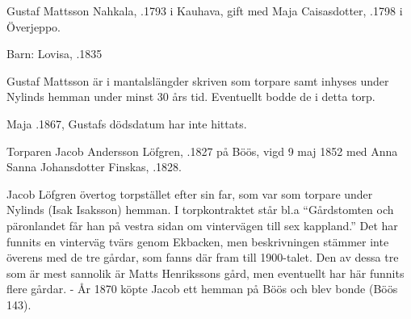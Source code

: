 Gustaf Mattsson Nahkala, .1793 i Kauhava, gift med Maja Caisasdotter, .1798 i Överjeppo.

Barn:	Lovisa, .1835

Gustaf Mattsson är i mantalslängder skriven som torpare samt inhyses under Nylinds hemman under minst 30 års tid. Eventuellt bodde de i detta torp.

Maja .1867, Gustafs dödsdatum har inte hittats.




Torparen Jacob Andersson Löfgren, .1827 på Böös, vigd 9 maj 1852 med Anna Sanna Johansdotter Finskas, .1828.
\begin{jhchildren}
  \item {}
  \item {}
  \item {}
  \item {}
  \item {}
  \item {}
  \item {}
\end{jhchildren}
Jacob Löfgren övertog torpstället efter sin far, som var som torpare under Nylinds (Isak Isaksson) hemman. I torpkontraktet står bl.a ``Gårdstomten och päronlandet får han på vestra sidan om vintervägen till sex kappland.'' Det har funnits en vinterväg tvärs genom Ekbacken, men beskrivningen stämmer inte överens med de tre gårdar, som fanns där fram till 1900-talet. Den av dessa tre som är mest sannolik är Matts Henrikssons gård, men eventuellt har här funnits flere gårdar. - År 1870 köpte Jacob ett hemman på Böös och blev bonde (Böös 143).


